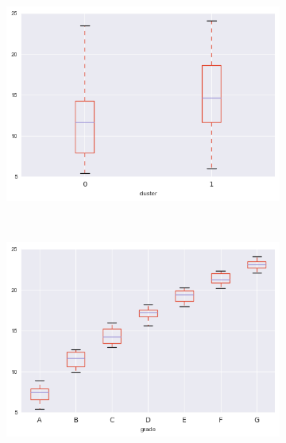 \begin{anexosenv}
\begin{figure}[t!]
\begin{subfigure}[t]{0.5\textwidth}
            \centerline{\includegraphics[width=1.05\textwidth]{img/int_rate_float_by_cluster}}
        \end{subfigure}%
        ~ 
        \begin{subfigure}[t]{0.5\textwidth}
            \centering
   
            \centerline{\includegraphics[width=1.05\textwidth]{img/int_rate_float_by_grade}}

        \end{subfigure}
\end{figure}



\begin{figure}[t!]
    \centering
        \caption{annual\textunderscore inc }
        \begin{subfigure}[t]{0.5\textwidth}
            \centering


\end{subfigure}
\end{figure}
\end{anexosenv}
